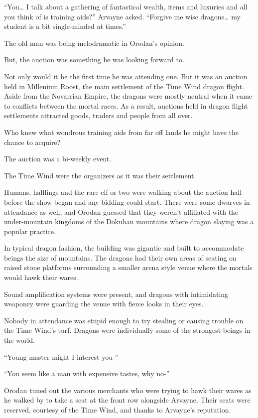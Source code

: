 \documentclass[a4paper,10pt]{book}
\begin{document}
“You… I talk about a gathering of fantastical wealth, items and luxuries and all you think of is training aids?” Arvayne asked. “Forgive me wise dragons… my student is a bit single-minded at times.”\par
The old man was being melodramatic in Orodan’s opinion.\par
But, the auction was something he was looking forward to.\par
Not only would it be the first time he was attending one. But it was an auction held in Millenium Roost, the main settlement of the Time Wind dragon flight. Aside from the Novarrian Empire, the dragons were mostly neutral when it came to conflicts between the mortal races. As a result, auctions held in dragon flight settlements attracted goods, traders and people from all over.\par
Who knew what wondrous training aids from far off lands he might have the chance to acquire?\par
\par
The auction was a bi-weekly event.\par
The Time Wind were the organizers as it was their settlement.\par
Humans, halflings and the rare elf or two were walking about the auction hall before the show began and any bidding could start. There were some dwarves in attendance as well, and Orodan guessed that they weren’t affiliated with the under-mountain kingdoms of the Dokuhan mountains where dragon slaying was a popular practice.\par
In typical dragon fashion, the building was gigantic and built to accommodate beings the size of mountains. The dragons had their own areas of seating on raised stone platforms surrounding a smaller arena style venue where the mortals would hawk their wares.\par
Sound amplification systems were present, and dragons with intimidating weaponry were guarding the venue with fierce looks in their eyes.\par
Nobody in attendance was stupid enough to try stealing or causing trouble on the Time Wind’s turf. Dragons were individually some of the strongest beings in the world.\par
“Young master might I interest you-”\par
“You seem like a man with expensive tastes, why no-”\par
Orodan tuned out the various merchants who were trying to hawk their wares as he walked by to take a seat at the front row alongside Arvayne. Their seats were reserved, courtesy of the Time Wind, and thanks to Arvayne’s reputation.\par
\end{document}

